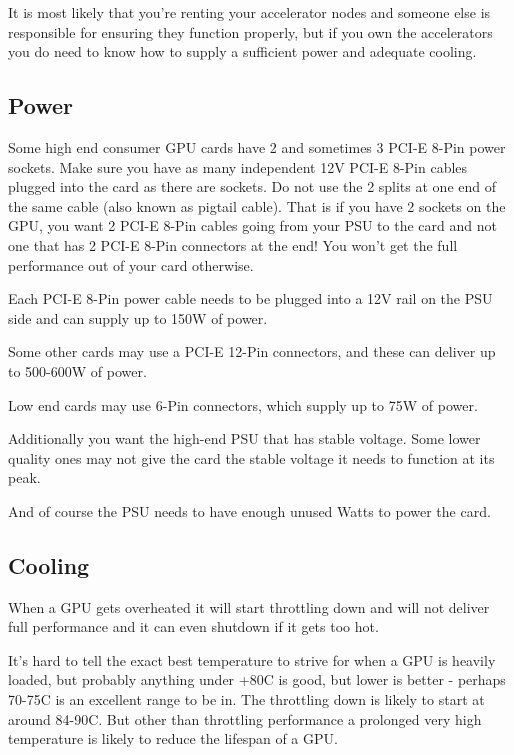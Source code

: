 \documentclass[
]{report}
\begin{document}
It is most likely that you're renting your accelerator nodes and someone
else is responsible for ensuring they function properly, but if you own
the accelerators you do need to know how to supply a sufficient power
and adequate cooling.

\subsection{Power}\label{power}

Some high end consumer GPU cards have 2 and sometimes 3 PCI-E 8-Pin
power sockets. Make sure you have as many independent 12V PCI-E 8-Pin
cables plugged into the card as there are sockets. Do not use the 2
splits at one end of the same cable (also known as pigtail cable). That
is if you have 2 sockets on the GPU, you want 2 PCI-E 8-Pin cables going
from your PSU to the card and not one that has 2 PCI-E 8-Pin connectors
at the end! You won't get the full performance out of your card
otherwise.

Each PCI-E 8-Pin power cable needs to be plugged into a 12V rail on the
PSU side and can supply up to 150W of power.

Some other cards may use a PCI-E 12-Pin connectors, and these can
deliver up to 500-600W of power.

Low end cards may use 6-Pin connectors, which supply up to 75W of power.

Additionally you want the high-end PSU that has stable voltage. Some
lower quality ones may not give the card the stable voltage it needs to
function at its peak.

And of course the PSU needs to have enough unused Watts to power the
card.

\subsection{Cooling}\label{cooling}

When a GPU gets overheated it will start throttling down and will not
deliver full performance and it can even shutdown if it gets too hot.

It's hard to tell the exact best temperature to strive for when a GPU is
heavily loaded, but probably anything under +80C is good, but lower is
better - perhaps 70-75C is an excellent range to be in. The throttling
down is likely to start at around 84-90C. But other than throttling
performance a prolonged very high temperature is likely to reduce the
lifespan of a GPU.
\end{document}
